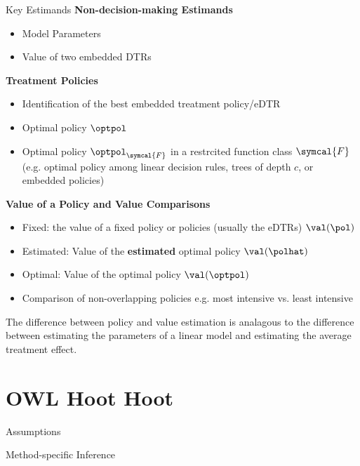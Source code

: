 \begin{frame}{Key Estimands}
	\textbf{Non-decision-making Estimands}
	\begin{itemize}
		\item Model Parameters
	\end{itemize}
	\vfill \pause

	\begin{itemize}
		\item Value of two embedded DTRs
	\end{itemize}

	\textbf{Treatment Policies}
	\begin{itemize}
		\item Identification of the best embedded treatment policy/eDTR
		\item Optimal policy $\optpol$
		\item Optimal policy $\optpol_{\symcal{F}}$ in a restrcited function
		      class $\symcal{F}$ (e.g. optimal policy among linear decision rules, trees of depth
		      $c$, or embedded policies)
	\end{itemize}
	\vfill \pause

	\textbf{Value of a Policy and Value Comparisons}
	\begin{itemize}
		\item Fixed: the value of a fixed policy or policies (usually the eDTRs) $\val(\pol)$
		\item Estimated: Value of the \textbf{estimated} optimal policy $\val(\polhat)$
		\item Optimal: Value of the optimal policy $\val(\optpol)$
		\item Comparison of non-overlapping policies e.g. most intensive vs. least intensive
	\end{itemize}

	\vfill \pause

	\footnotesize The difference between policy and value estimation is analagous to the
	difference between estimating the parameters of a linear model and estimating
	the average treatment effect.
\end{frame}


\section{OWL Hoot Hoot}
\begin{frame}{Assumptions}
\end{frame}

\begin{frame}{Method-specific Inference}
\end{frame}


